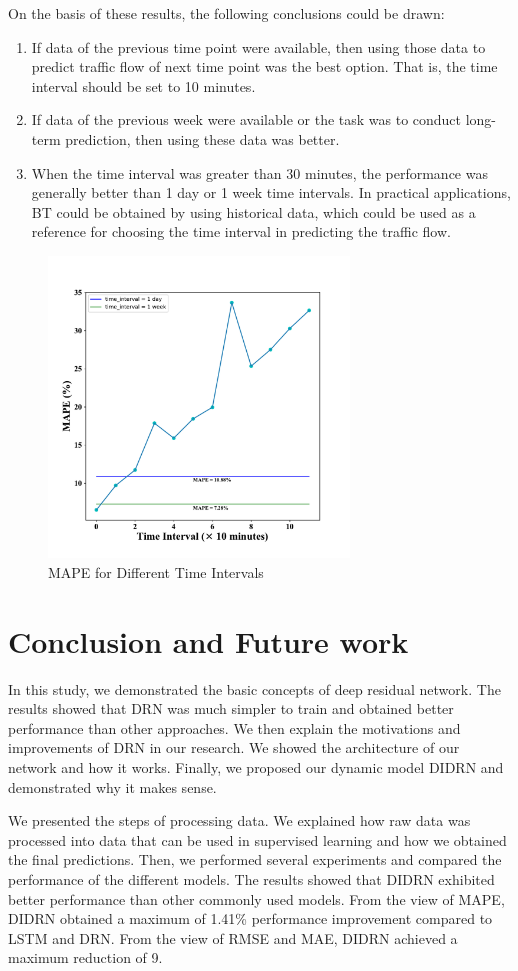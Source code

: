 \documentclass[twocolumn]{article}
\begin{document}
\par
On the basis of these results, the following conclusions could be drawn:
\begin{enumerate}
    \item If data of the previous time point were available, then using those data to predict traffic flow of next time point was the best option. That is, the time interval should be set to 10 minutes.
    \item If data of the previous week were available or the task was to conduct long-term prediction, then using these data was better.
    \item When the time interval was greater than 30 minutes, the performance was generally better than 1 day or 1 week time intervals. In practical applications, BT could be obtained by using historical data, which could be used as a reference for choosing the time interval in predicting the traffic flow. 
\end{enumerate}
\begin{figure}
    \centering
    \includegraphics[width = 8cm]{Figure/Bound.pdf}
    \caption{MAPE for Different Time Intervals}
    \label{fig:12}
\end{figure}

\section{Conclusion and Future work} \label{sec:confw}

In this study, we demonstrated the basic concepts of deep residual network. The results showed that DRN was much simpler to train and obtained better performance than other approaches. We then explain the motivations and improvements of DRN in our research. We showed the architecture of our network and how it works. Finally, we proposed our dynamic model DIDRN and demonstrated why it makes sense.
\par
We presented the steps of processing data. We explained how raw data was processed into data that can be used in supervised learning and how we obtained the final predictions. Then, we performed several experiments and compared the performance of the different models. The results showed that DIDRN exhibited better performance than other commonly used models. From the view of MAPE, DIDRN obtained a maximum of 1.41\% performance improvement compared to LSTM and DRN.  From the view of RMSE and MAE, DIDRN achieved a maximum reduction of 9.
\end{document}

